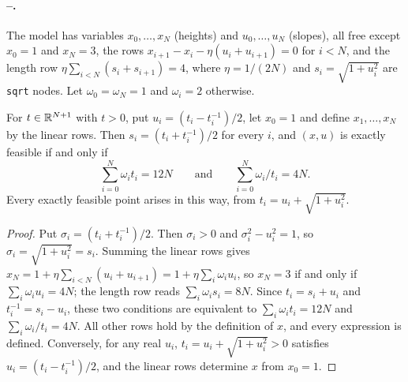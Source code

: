 \paragraph{--.}
The model has variables $x_0,\dots,x_N$ (heights) and $u_0,\dots,u_N$ (slopes), all free except $x_0=1$ and $x_N=3$, the rows $x_{i+1}-x_i-\eta(u_i+u_{i+1})=0$ for $i<N$, and the length row $\eta\sum_{i<N}(s_i+s_{i+1})=4$, where $\eta=1/(2N)$ and $s_i=\sqrt{1+u_i^2}$ are \texttt{sqrt} nodes.
Let $\omega_0=\omega_N=1$ and $\omega_i=2$ otherwise.

\begin{lemma}\label{lem:pts-chain}
For $t\in\mathbb{R}^{N+1}$ with $t>0$, put $u_i=(t_i-t_i^{-1})/2$, let $x_0=1$ and define $x_1,\dots,x_N$ by the linear rows.
Then $s_i=(t_i+t_i^{-1})/2$ for every $i$, and $(x,u)$ is exactly feasible if and only if
\[
\sum_{i=0}^N\omega_it_i=12N\qquad\text{and}\qquad\sum_{i=0}^N\omega_i/t_i=4N .
\]
Every exactly feasible point arises in this way, from $t_i=u_i+\sqrt{1+u_i^2}$.
\end{lemma}

\begin{proof}
Put $\sigma_i=(t_i+t_i^{-1})/2$.
Then $\sigma_i>0$ and $\sigma_i^2-u_i^2=1$, so $\sigma_i=\sqrt{1+u_i^2}=s_i$.
Summing the linear rows gives $x_N=1+\eta\sum_{i<N}(u_i+u_{i+1})=1+\eta\sum_i\omega_iu_i$, so $x_N=3$ if and only if $\sum_i\omega_iu_i=4N$; the length row reads $\sum_i\omega_is_i=8N$.
Since $t_i=s_i+u_i$ and $t_i^{-1}=s_i-u_i$, these two conditions are equivalent to $\sum_i\omega_it_i=12N$ and $\sum_i\omega_i/t_i=4N$.
All other rows hold by the definition of $x$, and every expression is defined.
Conversely, for any real $u_i$, $t_i=u_i+\sqrt{1+u_i^2}>0$ satisfies $u_i=(t_i-t_i^{-1})/2$, and the linear rows determine $x$ from $x_0=1$.
\end{proof}

